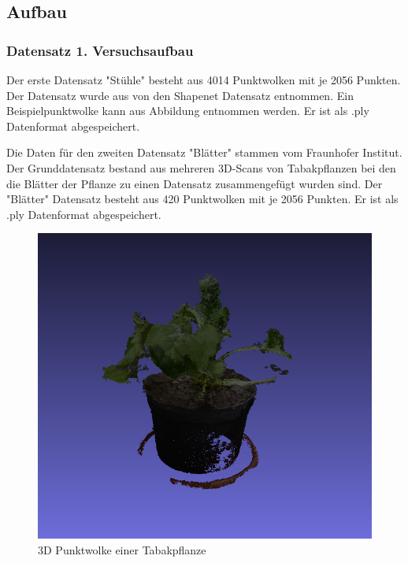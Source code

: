 \documentclass{llncs}
\begin{document}
\subsection{Aufbau}
\subsubsection{Datensatz 1. Versuchsaufbau}
Der erste Datensatz "Stühle" besteht aus 4014 Punktwolken mit je 2056 Punkten. Der Datensatz wurde aus von den Shapenet Datensatz entnommen. Ein Beispielpunktwolke kann aus Abbildung entnommen werden. Er ist als .ply Datenformat abgespeichert. 

 Die Daten für den zweiten Datensatz "Blätter" stammen vom Fraunhofer Institut. Der Grunddatensatz bestand aus mehreren 3D-Scans von Tabakpflanzen bei den die Blätter der Pflanze zu einen Datensatz zusammengefügt wurden sind. Der "Blätter" Datensatz besteht aus 420 Punktwolken mit je 2056 Punkten. Er ist als .ply Datenformat abgespeichert.
\begin{figure}[htbp] 
	\centering
	\includegraphics[width=1.2\textwidth]{plant.png}
	\caption{3D Punktwolke einer Tabakpflanze}
	\label{fig:Bild2}
\end{figure}
\end{document}
